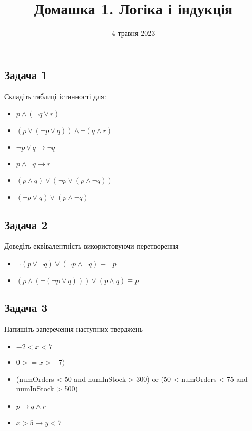 \documentclass{article}
\begin{document}
\title{Домашка 1. Логіка і індукція}
\date{4 травня 2023}

\maketitle

\subsection*{Задача 1}
Складіть таблиці істинності для:
\begin{itemize}
    \item $p \land (\lnot q \lor r)$
    \item $(p \lor (\lnot p \lor q)) \land \lnot (q \land r)$
    \item $\lnot p \lor q \rightarrow \lnot q$
    \item $p \land \lnot q \rightarrow r $
    \item $(p \land q) \lor (\lnot p \lor (p \land \lnot q))$
    \item $(\lnot p \lor q) \lor (p \land \lnot q)$
\end{itemize}

\subsection*{Задача 2}
Доведіть еквівалентність використовуючи перетворення
\begin{itemize}
    \item $\lnot(p \lor \lnot q) \lor (\lnot p \land \lnot q) \equiv \lnot p$
    \item $(p \land (\lnot (\lnot p \lor q))) \lor (p \land q) \equiv p$
\end{itemize}

\subsection*{Задача 3}
Напишіть заперечення наступних тверджень
\begin{itemize}
    \item $-2 < x < 7$
    \item $0 >= x > -7)$
    \item (numOrders < 50 and numInStock > 300) or (50 < numOrders < 75 and numInStock > 500)
    \item $p \rightarrow q \land r$
    \item $x > 5 \rightarrow y < 7$
\end{itemize}
\end{document}
